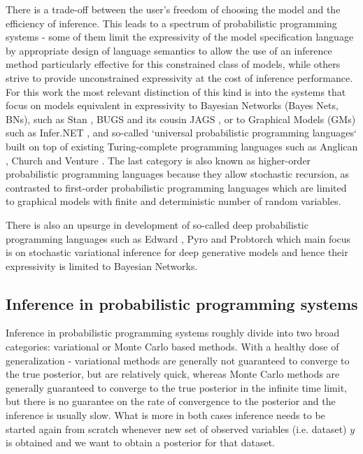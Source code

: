 \documentclass[12pt]{article}
\begin{document}
There is a trade-off between the user's freedom of choosing the model and the efficiency of inference.
This leads to a spectrum of probabilistic programming systems - some of them limit the expressivity of the model specification language by appropriate design of language semantics to allow the use of an inference method particularly effective for this constrained class of models, while others strive to provide unconstrained expressivity at the cost of inference performance.
For this work the most relevant distinction of this kind is into the systems that focus on models equivalent in expressivity to Bayesian Networks (Bayes Nets, BNs), such as Stan \citep{Stan}, BUGS \citep{WinBUGS,BUGSproject} and its cousin JAGS \citep{JAGS}, or to Graphical Models (GMs) such as Infer.NET \citep{InferNET}, and so-called `universal probabilistic programming languages` built on top of existing Turing-complete programming languages such as Anglican \citep{anglican}, Church \citep{GoodmanEtAl2008} and Venture \citep{venture}.
The last category is also known as higher-order probabilistic programming languages because they allow stochastic recursion, as contrasted to first-order probabilistic programming languages which are limited to graphical models with finite and deterministic number of random variables.

There is also an upsurge in development of so-called deep probabilistic programming languages such as Edward \citep{TranEtAl2016}, Pyro \citep{Pyro2018} and Probtorch \citep{Siddharth2017} which main focus is on stochastic variational inference for deep generative models and hence their expressivity is limited to Bayesian Networks.



\subsection{Inference in probabilistic programming systems}
Inference in probabilistic programming systems roughly divide into two broad categories: variational or Monte Carlo based methods.
With a healthy dose of generalization - variational methods are generally not guaranteed to converge to the true posterior, but are relatively quick, whereas Monte Carlo methods are generally guaranteed to converge to the true posterior in the infinite time limit, but there is no guarantee on the rate of convergence to the posterior and the inference is usually slow.
What is more in both cases inference needs to be started again from scratch whenever new set of observed variables (i.e. dataset) $y$ is obtained and we want to obtain a posterior for that dataset.  
\end{document}
